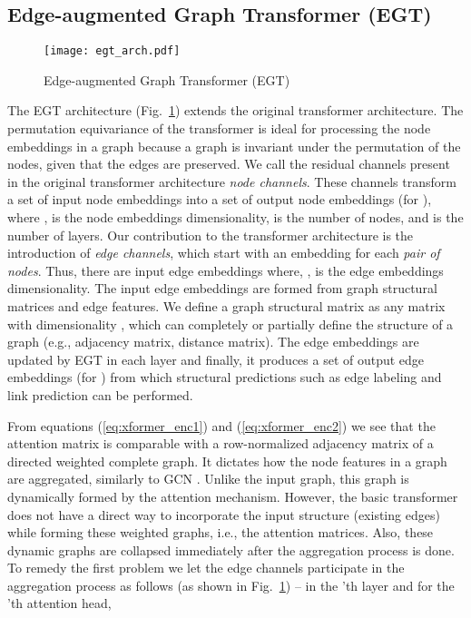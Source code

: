 \documentclass[sigconf,authorversion]{acmart}
\begin{document}
\subsection{Edge-augmented Graph Transformer (EGT)}
\begin{figure}[!t]
  \centering
  \texttt{[image: egt\_arch.pdf]}
  \caption{Edge-augmented Graph Transformer (EGT)}
  \label{fig:arch}
\end{figure}
The EGT architecture (Fig.~\ref{fig:arch}) extends the original transformer architecture. The permutation equivariance of the transformer is ideal for processing the node embeddings in a graph because a graph is invariant under the permutation of the nodes, given that the edges are preserved. We call the residual channels present in the original transformer architecture \emph{node channels}. These channels transform a set of input node embeddings  into a set of output node embeddings  (for ), where  ,  is the node embeddings dimensionality,   is the number of nodes, and  is the number of layers. Our contribution to the transformer architecture is the introduction of \emph{edge channels}, which start with an embedding for each \emph{pair of nodes}. Thus, there are  input edge embeddings  where, ,  is the edge embeddings dimensionality. The input edge embeddings are formed from graph structural matrices and edge features. We define a graph structural matrix as any matrix with dimensionality , which can completely or partially define the structure of a graph (e.g., adjacency matrix, distance matrix). The edge embeddings are updated by EGT in each layer and finally, it produces a set of output edge embeddings  (for ) from which structural predictions such as edge labeling and link prediction can be performed.

From equations (\ref{eq:xformer_enc1}) and (\ref{eq:xformer_enc2}) we see that the attention matrix is comparable with a row-normalized adjacency matrix of a directed weighted complete graph. It dictates how the node features in a graph are aggregated, similarly to GCN \citep{kipf2016semi}. Unlike the input graph, this graph is dynamically formed by the attention mechanism. However, the basic transformer does not have a direct way to incorporate the input structure (existing edges) while forming these weighted graphs, i.e., the attention matrices. Also, these dynamic graphs are collapsed immediately after the aggregation process is done. To remedy the first problem we let the edge channels participate in the aggregation process as follows (as shown in Fig.~\ref{fig:arch}) -- in the 'th layer and for the 'th attention head,
\end{document}
